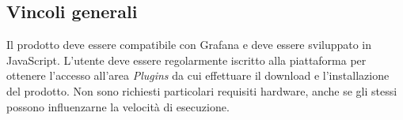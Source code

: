 \subsection{Vincoli generali}
Il prodotto deve essere compatibile con Grafana e deve essere sviluppato in JavaScript. L'utente deve essere regolarmente iscritto alla piattaforma per ottenere l'accesso all'area \emph{Plugins} da cui effettuare il download e l'installazione del prodotto. Non sono richiesti particolari requisiti hardware, anche se gli stessi possono influenzarne la velocità di esecuzione.

\pagebreak
